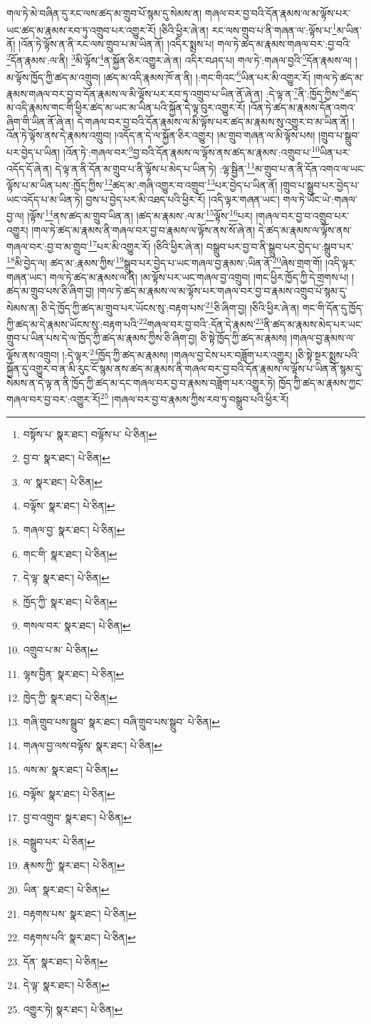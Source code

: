 གལ་ཏེ་མེ་བཞིན་དུ་རང་ལས་ཚད་མ་གྲུབ་པོ་སྙམ་དུ་སེམས་ན། གཞལ་བར་བྱ་བའི་དོན་རྣམས་ལ་མ་ལྟོས་པར་ཡང་ཚད་མ་རྣམས་རབ་ཏུ་འགྲུབ་པར་འགྱུར་རོ། །ཅིའི་ཕྱིར་ཞེ་ན། རང་ལས་གྲུབ་པ་ནི་གཞན་ལ་:ལྟོས་པ་\footnote{བསྟོས་པ་  སྣར་ཐང་། བལྟོས་པ་  པེ་ཅིན། }མ་ཡིན་ནོ། །འོན་ཏེ་ལྟོས་ན་ནི་རང་ལས་གྲུབ་པ་མ་ཡིན་ནོ། །འདིར་སྨྲས་པ། གལ་ཏེ་ཚད་མ་རྣམས་གཞལ་བར་:བྱ་བའི་\footnote{བྱ་བ་  སྣར་ཐང་།  པེ་ཅིན། }དོན་རྣམས་:ལ་ནི། \footnote{ལ་  སྣར་ཐང་།  པེ་ཅིན། }མི་ལྟོས་\footnote{བལྟོས་  སྣར་ཐང་།  པེ་ཅིན། }ན་སྐྱོན་ཅིར་འགྱུར་ཞེ་ན། འདིར་བཤད་པ། གལ་ཏེ་:གཞལ་བྱའི་\footnote{གཞལ་བྱ་  སྣར་ཐང་།  པེ་ཅིན། }དོན་རྣམས་ལ། །མ་ལྟོས་ཁྱོད་ཀྱི་ཚད་མ་འགྲུབ། །ཚད་མ་འདི་རྣམས་ཁོ་ན་ནི། །:གང་གིའང་\footnote{གང་གི་  སྣར་ཐང་།  པེ་ཅིན། }ཡིན་པར་མི་འགྱུར་རོ། །གལ་ཏེ་ཚད་མ་རྣམས་གཞལ་བར་བྱ་བ་དོན་རྣམས་ལ་མི་ལྟོས་པར་རབ་ཏུ་འགྲུབ་པ་ཡིན་ནོ་ཞེ་ན། :དེ་ལྟ་ན་\footnote{དེ་ལྟ་  སྣར་ཐང་།  པེ་ཅིན། }ནི་:ཁྱོད་ཀྱིས་\footnote{ཁྱོད་ཀྱི་  སྣར་ཐང་།  པེ་ཅིན། }ཚད་མ་འདི་རྣམས་གང་གི་ཕྱིར་ཚད་མ་ཡང་མ་ཡིན་པའི་སྐྱོན་དེ་ལྟ་བུར་འགྱུར་རོ། །འོན་ཏེ་ཚད་མ་རྣམས་དོན་འགའ་ཞིག་གི་ཡིན་ནོ་ཞེ་ན། དེ་གཞལ་བར་བྱ་བའི་དོན་རྣམས་ལ་མི་ལྟོས་པར་ཚད་མ་རྣམས་སུ་འགྱུར་བ་མ་ཡིན་ནོ། །འོན་ཏེ་ལྟོས་ནས་དེ་རྣམས་འགྲུབ། །འདོད་ན་དེ་ལ་སྐྱོན་ཅིར་འགྱུར། །མ་གྲུབ་གཞན་ལ་མི་ལྟོས་པས། །གྲུབ་པ་སྒྲུབ་པར་བྱེད་པ་ཡིན། །འོན་ཏེ་:གཞལ་བར་\footnote{གསལ་བར་  སྣར་ཐང་།  པེ་ཅིན། }བྱ་བའི་དོན་རྣམས་ལ་ལྟོས་ནས་ཚད་མ་རྣམས་:འགྲུབ་པ་\footnote{འགྲུབ་པ་མ་  པེ་ཅིན། }ཡིན་པར་འདོད་དོ་ཞེ་ན། དེ་ལྟ་ན་ནི་དོན་མ་གྲུབ་པ་ནི་ལྟོས་པ་མེད་པ་ཡིན་ཏེ། :ལྷ་སྦྱིན་\footnote{ལྷས་བྱིན་  སྣར་ཐང་།  པེ་ཅིན། }མ་གྲུབ་པ་ན་ནི་དོན་འགའ་ལ་ཡང་ལྟོས་པ་མ་ཡིན་པས་:ཁྱོད་ཀྱིས་\footnote{ཁྱེད་ཀྱི་  སྣར་ཐང་།  པེ་ཅིན། }ཚད་མ་:གཞི་འགྱུར་བ་འགྲུབ་\footnote{གཞི་གྲུབ་པས་སྒྲུབ་  སྣར་ཐང་། བཞི་གྲུབ་པས་སྒྲུབ་  པེ་ཅིན། }པར་བྱེད་པ་ཡིན་ནོ། །གྲུབ་པ་སྒྲུབ་པར་བྱེད་པ་ཡང་འདོད་པ་མ་ཡིན་ཏེ། བྱས་པ་བྱེད་པར་མི་འཐད་པའི་ཕྱིར་རོ། །འདི་ལྟར་གཞན་ཡང་། གལ་ཏེ་ཡོང་ཡེ་:གཞལ་བྱ་ལ། །ལྟོས་\footnote{གཞལ་བྱ་ལས་བལྟོས་  སྣར་ཐང་།  པེ་ཅིན། }ནས་ཚད་མ་གྲུབ་ཡིན་ན། །ཚད་མ་རྣམས་:ལ་མ་\footnote{ལས་མ་  སྣར་ཐང་།  པེ་ཅིན། }ལྟོས་\footnote{བལྟོས་  སྣར་ཐང་།  པེ་ཅིན། }པར། །གཞལ་བར་བྱ་བ་འགྲུབ་པར་འགྱུར། །གལ་ཏེ་ཚད་མ་རྣམས་ནི་གཞལ་བར་བྱ་བ་རྣམས་ལ་ལྟོས་ནས་སོ་ཞེ་ན། དེ་ཚད་མ་རྣམས་ལ་ལྟོས་ནས་གཞལ་བར་:བྱ་བ་མ་གྲུབ་\footnote{བྱ་བ་འགྲུབ་  སྣར་ཐང་།  པེ་ཅིན། }པར་མི་འགྱུར་རོ། །ཅིའི་ཕྱིར་ཞེ་ན། བསྒྲུབ་པར་བྱ་བ་ནི་སྒྲུབ་པར་བྱེད་པ་:སྒྲུབ་པར་\footnote{བསྒྲུབ་པར་  པེ་ཅིན། }མི་བྱེད་ལ། ཚད་མ་:རྣམས་ཀྱིས་\footnote{རྣམས་ཀྱི་  སྣར་ཐང་།  པེ་ཅིན། }སྒྲུབ་པར་བྱེད་པ་ཡང་གཞལ་བྱ་རྣམས་:ཡིན་ནོ་\footnote{ཡིན་  སྣར་ཐང་།  པེ་ཅིན། }ཞེས་གྲག་གོ། །འདི་ལྟར་གཞན་ཡང་། གལ་ཏེ་ཚད་མ་རྣམས་ལ་ནི། །མ་ལྟོས་པར་ཡང་གཞལ་བྱ་འགྲུབ། །གང་ཕྱིར་ཁྱོད་ཀྱི་དེ་གྲགས་པ། །ཚད་མ་གྲུབ་པས་ཅི་ཞིག་བྱ། །གལ་ཏེ་ཚད་མ་རྣམས་ལ་མ་ལྟོས་པར་གཞལ་བར་བྱ་བ་རྣམས་འགྲུབ་པོ་སྙམ་དུ་སེམས་ན། ཅི་དེ་ཁྱོད་ཀྱི་ཚད་མ་གྲུབ་པར་ཡོངས་སུ་:བརྟག་པས་\footnote{བརྟགས་པས་  སྣར་ཐང་།  པེ་ཅིན། }ཅི་ཞིག་བྱ། །ཅིའི་ཕྱིར་ཞེ་ན། གང་གི་དོན་དུ་ཁྱོད་ཀྱི་ཚད་མ་དེ་རྣམས་ཡོངས་སུ་:བརྟག་པའི་\footnote{བརྟགས་པའི་  སྣར་ཐང་།  པེ་ཅིན། }གཞལ་བར་བྱ་བའི་:དོན་དེ་རྣམས་\footnote{དོན་  སྣར་ཐང་།  པེ་ཅིན། }ནི་ཚད་མ་རྣམས་མེད་པར་ཡང་གྲུབ་པ་ཡིན་པས་དེ་ལ་ཁྱོད་ཀྱི་ཚད་མ་རྣམས་ཀྱིས་ཅི་ཞིག་བྱ། ཅི་སྟེ་ཁྱོད་ཀྱི་ཚད་མ་རྣམས། །གཞལ་བྱ་རྣམས་ལ་ལྟོས་ནས་འགྲུབ། །:དེ་ལྟར་\footnote{དེ་ལྟ་  སྣར་ཐང་།  པེ་ཅིན། }ཁྱོད་ཀྱི་ཚད་མ་རྣམས། །གཞལ་བྱ་ངེས་པར་བཟློག་པར་འགྱུར། །ཅི་སྟེ་སྔར་སྨྲས་པའི་སྐྱོན་དུ་འགྱུར་བ་ན་མི་རུང་ངོ་སྙམ་ནས་ཚད་མ་རྣམས་ནི་གཞལ་བར་བྱ་བའི་དོན་རྣམས་ལ་ལྟོས་པ་ཡིན་ནོ་སྙམ་དུ་སེམས་ན་དེ་ལྟ་ན་ནི་ཁྱོད་ཀྱི་ཚད་མ་དང་གཞལ་བར་བྱ་བ་རྣམས་བཟློག་པར་འགྱུར་ཏེ། ཁྱོད་ཀྱི་ཚད་མ་རྣམས་ཀྱང་གཞལ་བར་བྱ་བར་:འགྱུར་རོ།\footnote{འགྱུར་ཏེ།  སྣར་ཐང་།  པེ་ཅིན། } །གཞལ་བར་བྱ་བ་རྣམས་ཀྱིས་རབ་ཏུ་བསྒྲུབ་པའི་ཕྱིར་རོ། 